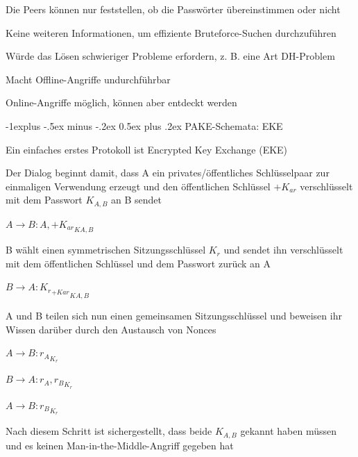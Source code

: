 \documentclass[a4paper]{article}
\makeatletter
\renewcommand{\subsection}{\@startsection{subsection}{2}{0mm}%
 {-1explus -.5ex minus -.2ex}%
 {0.5ex plus .2ex}%
 {\normalfont\normalsize\bfseries}}
\makeatother
\begin{document}
\begin{multicols}{3}
\begin{itemize*}
\begin{itemize*}
                  \item Die Peers können nur feststellen, ob die Passwörter übereinstimmen oder nicht
                  \item Keine weiteren Informationen, um effiziente Bruteforce-Suchen durchzuführen
                  \begin{itemize*}
                        \item Würde das Lösen schwieriger Probleme erfordern, z. B. eine Art DH-Problem
                        \item Macht Offline-Angriffe undurchführbar
                  \end{itemize*}
                  \item Online-Angriffe möglich, können aber entdeckt werden
            \end{itemize*}
      \end{itemize*}

      \subsection{PAKE-Schemata: EKE}
      \begin{itemize*}
            \item Ein einfaches erstes Protokoll ist Encrypted Key Exchange (EKE)
            \item Der Dialog beginnt damit, dass A ein privates/öffentliches Schlüsselpaar zur einmaligen Verwendung erzeugt und den öffentlichen Schlüssel $+K_{ar}$ verschlüsselt mit dem Passwort $K_{A,B}$ an B sendet
            \begin{enumerate*}
                  \item $A\rightarrow B:A,{+K_{ar}}_{{K}{A,B}}$
            \end{enumerate*}
            \item B wählt einen symmetrischen Sitzungsschlüssel $K_r$ und sendet ihn verschlüsselt mit dem öffentlichen Schlüssel und dem Passwort zurück an A
            \begin{enumerate*}
                  \item $B\rightarrow A:{{K_r}_{{+K}{ar}}}_{{K}{A,B}}$
            \end{enumerate*}
            \item A und B teilen sich nun einen gemeinsamen Sitzungsschlüssel und beweisen ihr Wissen darüber durch den Austausch von Nonces
            \begin{enumerate*}
                  \item $A\rightarrow B:{r_A}_{K_r}$
                  \item $B\rightarrow A:{r_A,r_B}_{K_r}$
                  \item $A\rightarrow B:{r_B}_{K_r}$
            \end{enumerate*}
            \item Nach diesem Schritt ist sichergestellt, dass beide $K_{A,B}$ gekannt haben müssen und es keinen Man-in-the-Middle-Angriff gegeben hat
      \end{itemize*}


\end{multicols}
\end{document}
